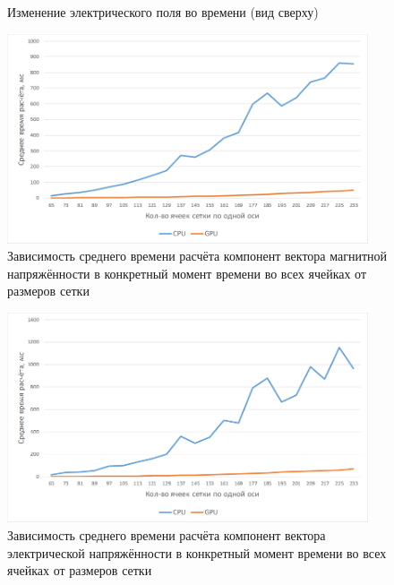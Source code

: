 \begin{figure}
\begin{subfigure}[b]{0.3\textwidth}
        \label{fig:mouse}
    \end{subfigure}

    \caption{Изменение электрического поля во времени (вид сверху)}\label{fig:animals}
\end{figure}
\clearpage
\begin{figure}[p]
\centering
\includegraphics[width=0.95\textwidth]{include/graphics/image12}
\caption{Зависимость среднего времени расчёта компонент вектора магнитной напряжённости в конкретный момент времени во всех ячейках от размеров сетки}
\label{fig:1stComparsion}
\end{figure}
\begin{figure}[p]
\centering
\includegraphics[width=0.95\textwidth]{include/graphics/image13}
\caption{Зависимость среднего времени расчёта компонент вектора электрической напряжённости в конкретный момент времени во всех ячейках от размеров сетки}
\label{fig:2ndComparsion}
\end{figure}

\clearpage